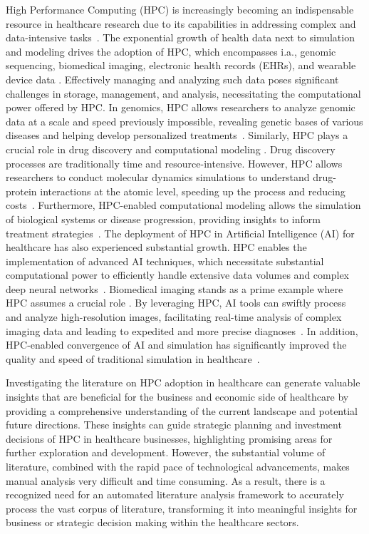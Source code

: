 High Performance Computing (HPC) is increasingly becoming an indispensable resource in healthcare research due to its capabilities in addressing complex and data-intensive tasks~\cite{elsebakhi2015large,raj2015big,jia2014gpu}. The exponential growth of health data next to simulation and modeling drives the adoption of HPC, which encompasses i.a., genomic sequencing, biomedical imaging, electronic health records (EHRs), and wearable device data \cite{bastrakov2013high,schmidt2017next,stocker2010high,alanazi2015meeting,vitabile2019medical}. Effectively managing and analyzing such data poses significant challenges in storage, management, and analysis, necessitating the computational power offered by HPC. In genomics, HPC allows researchers to analyze genomic data at a scale and speed previously impossible, revealing genetic bases of various diseases and helping develop personalized treatments~\cite{molidor2003new,lightbody2019review}. Similarly, HPC plays a crucial role in drug discovery and computational modeling  \cite{CHEN20181241,jumper2021highly}.
Drug discovery processes are traditionally time and resource-intensive. However, HPC allows researchers to conduct molecular dynamics simulations to understand drug-protein interactions at the atomic level, speeding up the process and reducing costs~\cite{zhang2014toward,ge2013molecular,sanbonmatsu2007high}. Furthermore, HPC-enabled computational modeling allows the simulation of biological systems or disease progression, providing insights to inform treatment strategies~\cite{kharche2008simulation,perrin2010model}. The deployment of HPC in Artificial Intelligence (AI) for healthcare has also experienced substantial growth. HPC enables the implementation of advanced AI techniques, which necessitate substantial computational power to efficiently handle extensive data volumes and complex deep neural networks~\cite{phong2017brain,cirillo2019big}. Biomedical imaging stands as a prime example where HPC assumes a crucial role \cite{LITJENS201760}. By leveraging HPC, AI tools can swiftly process and analyze high-resolution images, facilitating real-time analysis of complex imaging data and leading to expedited and more precise diagnoses~\cite{cai2020review,tahmassebi2018deep}. In addition, HPC-enabled convergence of AI and simulation has significantly improved the quality and speed of traditional simulation in healthcare~\cite{lee2019deepdrivemd,bai2022application}. 

Investigating the literature on HPC adoption in healthcare can generate valuable insights that are beneficial for the business and economic side of healthcare by providing a comprehensive understanding of the current landscape and potential future directions. These insights can guide strategic planning and investment decisions of HPC in healthcare businesses, highlighting promising areas for further exploration and development. However, the substantial volume of literature, combined with the rapid pace of technological advancements, makes manual analysis very difficult and time consuming. As a result, there is a recognized need for an automated literature analysis framework to accurately process the vast corpus of literature, transforming it into meaningful insights for business or strategic decision making within the healthcare sectors.

